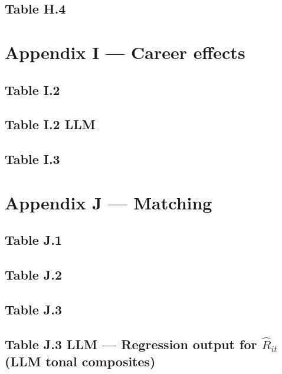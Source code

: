 \documentclass[12pt]{article}
\begin{document}
\subsection{Table H.4}

\clearpage

\section{Appendix I --- Career effects}

\subsection{Table I.2}

\clearpage

\subsection{Table I.2 LLM}

\clearpage

\subsection{Table I.3}

\clearpage

\section{Appendix J --- Matching}

\subsection{Table J.1}

\clearpage

\subsection{Table J.2}

\clearpage

\subsection{Table J.3}

\clearpage

\subsection{Table J.3 LLM --- Regression output for \(\widehat R_{it}\) (LLM tonal composites)}

\clearpage
\end{document}
